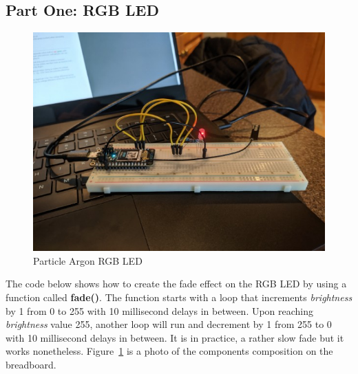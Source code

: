 \documentclass{article}
\begin{document}
\subsection{Part One: RGB LED}
\begin{figure}[H]
\center
\includegraphics[width=\textwidth]{images/fade.jpeg}
\caption{Particle Argon RGB LED}
\label{fig:fade}
\end{figure}

The code below shows how to create the fade effect on the RGB LED by using a function called \textbf{fade()}. The function starts with a loop that increments \textit{brightness} by 1 from 0 to 255 with 10 millisecond delays in between. Upon reaching \textit{brightness} value 255, another loop will run and decrement by 1 from 255 to 0 with 10 millisecond delays in between. It is in practice, a rather slow fade but it works nonetheless. Figure~\ref{fig:fade} is a photo of the components composition on the breadboard.

\begin{minipage}[c]{\textwidth}

\end{minipage}
\end{document}
